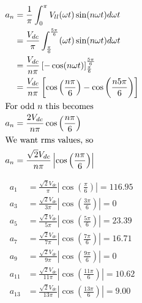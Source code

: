\subsection{}

\begin{align*}
a_n & = \frac{1}{\pi} \int_0^\pi V_{ll}(\omega t) \sin(n \omega t) d \omega t \\
    & = \frac{V_{dc}}{\pi} \int_{\frac{\pi}{6}}^{\frac{5\pi}{6}} (\omega t) \sin(n \omega t) d \omega t \\
    & = \frac{V_{dc}}{n\pi} \left[ -\cos(n \omega t )\right]_{\frac{\pi}{6}}^{\frac{5\pi}{6}} \\
    & = \frac{V_{dc}}{n\pi} \left[ \cos\left( \frac{n\pi}{6}\right) - \cos\left( \frac{n5\pi}{6}\right) \right] \\
\intertext{For odd $n$ this becomes}
a_n & = \frac{2V_{dc}}{n\pi} \cos\left( \frac{n\pi}{6}\right)  \\
\intertext{We want rms values, so}
a_n & = \frac{\sqrt{2}V_{dc}}{n\pi} \left| \cos \left( \frac{n\pi}{6} \right) \right| \\
\end{align*}

\begin{align*}
a_1 & = \frac{\sqrt{2}V_{dc}}{\pi} \left| \cos\left( \frac{\pi}{6}\right) \right| = 116.95 \\
a_3 & = \frac{\sqrt{2}V_{dc}}{3\pi} \left| \cos\left( \frac{3\pi}{6}\right) \right| = 0 \\
a_5 & = \frac{\sqrt{2}V_{dc}}{5\pi} \left| \cos\left( \frac{5\pi}{6}\right) \right| = 23.39 \\
a_7 & = \frac{\sqrt{2}V_{dc}}{7\pi} \left| \cos\left( \frac{7\pi}{6}\right) \right| = 16.71 \\
a_9 & = \frac{\sqrt{2}V_{dc}}{9\pi} \left| \cos\left( \frac{9\pi}{6}\right) \right| = 0 \\
a_{11} & = \frac{\sqrt{2}V_{dc}}{11\pi} \left| \cos\left( \frac{11\pi}{6}\right) \right| = 10.62 \\
a_{13} & = \frac{\sqrt{2}V_{dc}}{13\pi} \left| \cos\left( \frac{13\pi}{6}\right) \right| = 9.00 \\
\end{align*}